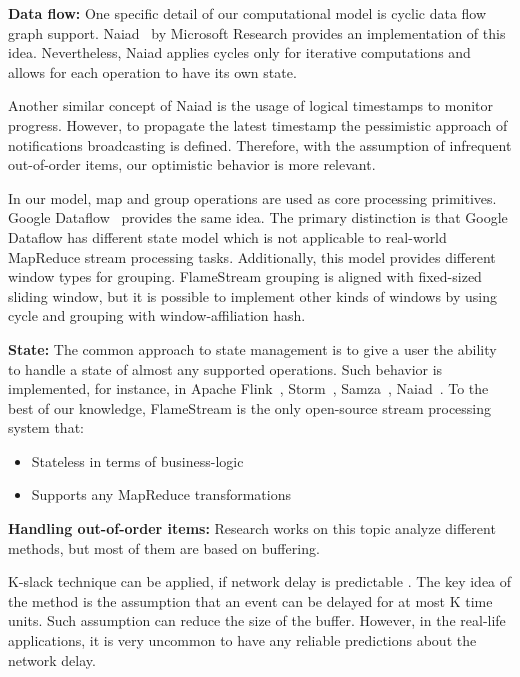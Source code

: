 
\label {fs-related-section}

{\bf Data flow:}
One specific detail of our computational model is cyclic data flow graph support. Naiad~\cite{Murray:2013:NTD:2517349.2522738} by Microsoft Research provides an implementation of this idea. Nevertheless, Naiad applies cycles only for iterative computations and allows for each operation to have its own state. 

Another similar concept of Naiad is the usage of logical timestamps to monitor progress. However, to propagate the latest timestamp the pessimistic approach of notifications broadcasting is defined. Therefore, with the assumption of infrequent out-of-order items, our optimistic behavior is more relevant.

In our model, map and group operations are used as core processing primitives. Google Dataflow~\cite{Akidau:2015:DMP:2824032.2824076} provides the same idea. The primary distinction is that Google Dataflow has different state model which is not applicable to real-world MapReduce stream processing tasks. Additionally, this model provides different window types for grouping. FlameStream grouping is aligned with fixed-sized sliding window, but it is possible to implement other kinds of windows by using cycle and grouping with window-affiliation hash.

{\bf State:}
The common approach to state management is to give a user the ability to handle a state of almost any supported operations. Such behavior is implemented, for instance, in Apache Flink~\cite{carbone2015apache}, Storm~\cite{apache:storm}, Samza~\cite{Noghabi:2017:SSS:3137765.3137770}, Naiad~\cite{Murray:2013:NTD:2517349.2522738}.
To the best of our knowledge, FlameStream is the only open-source stream processing system that:
\begin{itemize}
    \item Stateless in terms of business-logic
    \item Supports any MapReduce transformations 
\end{itemize}

{\bf Handling out-of-order items:}
Research works on this topic analyze different methods, but most of them are based on buffering.

K-slack technique can be applied, if network delay is predictable \cite{Babu:2004:EKC:1016028.1016032, Li:2007:ESP:1270388.1270975}. The key idea of the method is the assumption that an event can be delayed for at most K time units. Such assumption can reduce the size of the buffer. However, in the real-life applications, it is very uncommon to have any reliable predictions about the network delay.

